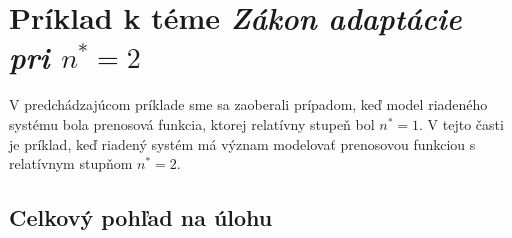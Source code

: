 \documentclass[a4paper, 10pt, ]{article}
\begin{document}
\begin{figure}[!t]
	\centering

    \vspace{-3mm}




    \vspace{-2mm}

	\caption{}
	\label{figsc_ar06_MRAC_8}


    \vspace{-2mm}

\end{figure}































\section{Príklad k téme \emph{Zákon adaptácie pri $n^* = 2$}}


V predchádzajúcom príklade sme sa zaoberali prípadom, keď model riadeného systému bola prenosová funkcia, ktorej relatívny stupeň bol $n^* = 1$. V tejto časti je príklad, keď riadený systém má význam modelovať prenosovou funkciou s relatívnym stupňom $n^* = 2$.








\subsection{Celkový pohľad na úlohu}
\end{document}
